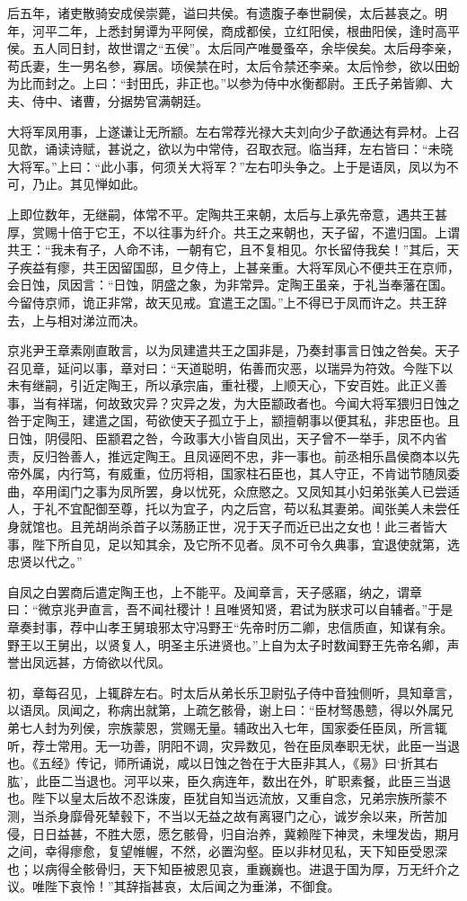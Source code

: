 \documentclass[]{article}
\begin{document}
后五年，诸吏散骑安成侯崇薨，谥曰共侯。有遗腹子奉世嗣侯，太后甚哀之。明年，河平二年，上悉封舅谭为平阿侯，商成都侯，立红阳侯，根曲阳侯，逢时高平侯。五人同日封，故世谓之``五侯''。太后同产唯曼蚤卒，余毕侯矣。太后母李亲，苟氏妻，生一男名参，寡居。顷侯禁在时，太后令禁还李亲。太后怜参，欲以田蚡为比而封之。上曰：``封田氏，非正也。''以参为侍中水衡都尉。王氏子弟皆卿、大夫、侍中、诸曹，分据势官满朝廷。

大将军凤用事，上遂谦让无所颛。左右常荐光禄大夫刘向少子歆通达有异材。上召见歆，诵读诗赋，甚说之，欲以为中常侍，召取衣冠。临当拜，左右皆曰：``未晓大将军。''上曰：``此小事，何须关大将军？''左右叩头争之。上于是语凤，凤以为不可，乃止。其见惮如此。

上即位数年，无继嗣，体常不平。定陶共王来朝，太后与上承先帝意，遇共王甚厚，赏赐十倍于它王，不以往事为纤介。共王之来朝也，天子留，不遣归国。上谓共王：``我未有子，人命不讳，一朝有它，且不复相见。尔长留侍我矣！''其后，天子疾益有瘳，共王因留国邸，旦夕侍上，上甚亲重。大将军凤心不便共王在京师，会日蚀，凤因言：``日蚀，阴盛之象，为非常异。定陶王虽亲，于礼当奉藩在国。今留侍京师，诡正非常，故天见戒。宜遣王之国。''上不得已于凤而许之。共王辞去，上与相对涕泣而决。

京兆尹王章素刚直敢言，以为凤建遣共王之国非是，乃奏封事言日蚀之咎矣。天子召见章，延问以事，章对曰：``天道聪明，佑善而灾恶，以瑞异为符效。今陛下以未有继嗣，引近定陶王，所以承宗庙，重社稷，上顺天心，下安百姓。此正义善事，当有祥瑞，何故致灾异？灾异之发，为大臣颛政者也。今闻大将军猥归日蚀之咎于定陶王，建遣之国，苟欲使天子孤立于上，颛擅朝事以便其私，非忠臣也。且日蚀，阴侵阳、臣颛君之咎，今政事大小皆自凤出，天子曾不一举手，凤不内省责，反归咎善人，推远定陶王。且凤诬罔不忠，非一事也。前丞相乐昌侯商本以先帝外属，内行笃，有威重，位历将相，国家柱石臣也，其人守正，不肯诎节随凤委曲，卒用闺门之事为凤所罢，身以忧死，众庶愍之。又凤知其小妇弟张美人已尝适人，于礼不宜配御至尊，托以为宜子，内之后宫，苟以私其妻弟。闻张美人未尝任身就馆也。且羌胡尚杀首子以荡肠正世，况于天子而近已出之女也！此三者皆大事，陛下所自见，足以知其余，及它所不见者。凤不可令久典事，宜退使就第，选忠贤以代之。''

自凤之白罢商后遣定陶王也，上不能平。及闻章言，天子感寤，纳之，谓章曰：``微京兆尹直言，吾不闻社稷计！且唯贤知贤，君试为朕求可以自辅者。''于是章奏封事，荐中山孝王舅琅邪太守冯野王``先帝时历二卿，忠信质直，知谋有余。野王以王舅出，以贤复人，明圣主乐进贤也。''上自为太子时数闻野王先帝名卿，声誉出凤远甚，方倚欲以代凤。

初，章每召见，上辄辟左右。时太后从弟长乐卫尉弘子侍中音独侧听，具知章言，以语凤。凤闻之，称病出就第，上疏乞骸骨，谢上曰：``臣材驽愚戆，得以外属兄弟七人封为列侯，宗族蒙恩，赏赐无量。辅政出入七年，国家委任臣凤，所言辄听，荐士常用。无一功善，阴阳不调，灾异数见，咎在臣凤奉职无状，此臣一当退也。《五经》传记，师所诵说，咸以日蚀之咎在于大臣非其人，《易》曰`折其右肱'，此臣二当退也。河平以来，臣久病连年，数出在外，旷职素餐，此臣三当退也。陛下以皇太后故不忍诛废，臣犹自知当远流放，又重自念，兄弟宗族所蒙不测，当杀身靡骨死辇毂下，不当以无益之故有离寝门之心，诚岁余以来，所苦加侵，日日益甚，不胜大愿，愿乞骸骨，归自治养，冀赖陛下神灵，未埋发齿，期月之间，幸得瘳愈，复望帷幄，不然，必置沟壑。臣以非材见私，天下知臣受恩深也；以病得全骸骨归，天下知臣被恩见哀，重巍巍也。进退于国为厚，万无纤介之议。唯陛下哀怜！''其辞指甚哀，太后闻之为垂涕，不御食。
\end{document}

